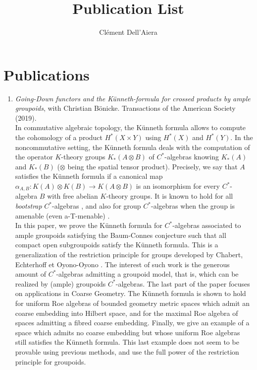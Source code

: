 \documentclass[a4paper]{article}
\title{Publication List}
\date{}
\author{ Clément Dell'Aiera}
\begin{document}
\maketitle

\section*{Publications}
\begin{enumerate}
\item \textit{Going-Down functors and the Künneth-formula for crossed products by ample groupoids}, with Christian Bönicke. Transactions of the American Society (2019).\\

In commutative algebraic topology, the K\"unneth formula allows to compute the cohomology of a product $H^*(X\times Y)$ using $H^*(X)$ and $H^*(Y)$. In the noncommutative setting, the K\"unneth formula deals with the computation of the operator $K$-theory groups $K_*(A \otimes B)$ of $C^*$-algebras knowing $K_*(A)$ and $K_*(B)$ ($\otimes$ being the spatial tensor product). Precisely, we say that $A$ satisfies the K\"unneth formula if a canonical map $\alpha_{A,B}: K(A)\otimes K(B) \rightarrow K(A\otimes B)$ is an isomorphism for every $C^*$-algebra $B$ with free abelian $K$-theory groups. It is known to hold for all \textit{bootstrap} $C^*$-algebras \cite{rosenberg1987kunneth}, and also for group $C^*$-algebras when the group is amenable (even a-T-menable) \cite{BaumConnesHigson}\cite{TuThese}. \\

In this paper, we prove the K\"unneth formula for $C^*$-algebras associated to ample groupoids satisfying the Baum-Connes conjecture such that all compact open subgroupoids satisfy the K\"unneth formula. This is a generalization of the restriction principle for groups developed by Chabert, Echterhoff et Oyono-Oyono \cite{ChabertEOY}. The interest of such work is the generous amount of $C^*$-algebras admitting a groupoid model, that is, which can be realized by (ample) groupoids $C^*$-algebras. The last part of the paper focuses on applications in Coarse Geometry. The K\"unneth formula is shown to hold for uniform Roe algebras of bounded geometry metric spaces which admit an coarse embedding into Hilbert space, and for the maximal Roe algebra of spaces admitting a fibred coarse embedding. Finally, we give an example of a space which admits no coarse embedding but whose uniform Roe algebras still satisfies the K\"unneth formula. This last example does not seem to be provable using previous methods, and use the full power of the restriction principle for groupoids.\\


\end{enumerate}
\end{document}
